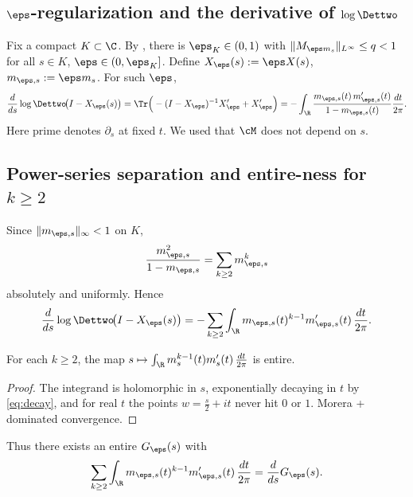 \subsection{\texorpdfstring{$\eps$}{epsilon}-regularization and the derivative of \(\log\Dettwo\)}
Fix a compact \(K\subset\C\). By , there is \(\eps_K\in(0,1)\) with \(\|M_{\eps m_s}\|_{L^\infty}\le q<1\) for all \(s\in K\), \(\eps\in(0,\eps_K]\). Define \(X_\eps(s):=\eps X(s)\), \(m_{\eps,s}:=\eps m_s\). For such \(\eps\),
\begin{equation}\label{eq:det2-deriv}
\frac{d}{ds}\log \Dettwo\!\big(I-X_\eps(s)\big)
=\Tr\Big(-(I-X_\eps)^{-1}X'_\eps + X'_\eps\Big)
= -\int_{\R}\frac{m_{\eps,s}(t)\,m'_{\eps,s}(t)}{1-m_{\eps,s}(t)}\frac{dt}{2\pi}.
\end{equation}
Here prime denotes \(\partial_s\) at fixed \(t\). We used that \(\cM\) does not depend on \(s\).

\subsection{Power-series separation and entire-ness for \texorpdfstring{$k\ge2$}{k>=2}}

Since \(\|m_{\eps,s}\|_\infty<1\) on \(K\),
\[
\frac{m_{\eps,s}^2}{1-m_{\eps,s}}=\sum_{k\ge 2} m_{\eps,s}^k
\]
absolutely and uniformly. Hence
\begin{equation}\label{eq:kge2sum}
\frac{d}{ds}\log \Dettwo\!\big(I-X_\eps(s)\big)
= -\sum_{k\ge 2}\int_{\R} m_{\eps,s}(t)^{k-1} m'_{\eps,s}(t)\,\frac{dt}{2\pi}.
\end{equation}

\begin{lemma}\label{lem:EntireKge2}
For each \(k\ge2\), the map \(s\mapsto \int_{\R} m_s^{k-1}(t) m'_s(t)\, \tfrac{dt}{2\pi}\) is entire.
\end{lemma}

\begin{proof}
The integrand is holomorphic in \(s\), exponentially decaying in \(t\) by \eqref{eq:decay}, and for real \(t\) the points \(w=\tfrac{s}{2}+it\) never hit \(0\) or \(1\). Morera + dominated convergence.
\end{proof}

Thus there exists an entire \(G_\eps(s)\) with
\begin{equation}\label{eq:GepsDef}
\sum_{k\ge 2}\int_{\R} m_{\eps,s}(t)^{k-1} m'_{\eps,s}(t)\,\frac{dt}{2\pi}
= \frac{d}{ds} G_\eps(s).
\end{equation}

